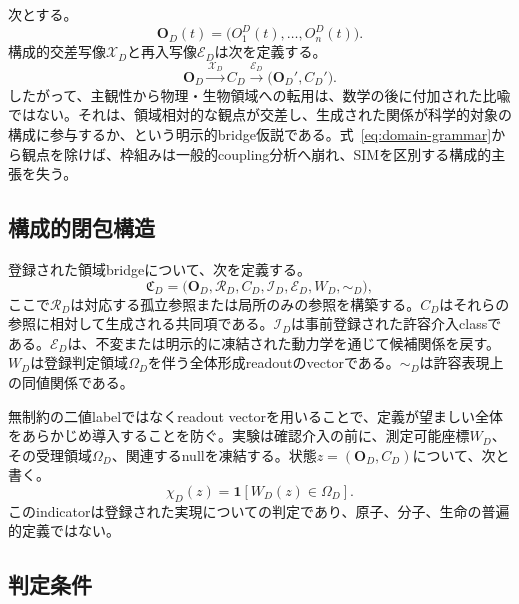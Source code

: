 \documentclass[11pt,a4paper]{article}
\begin{document}
次とする。
\begin{equation}
 \mathbf O_D(t)=\bigl(O_1^D(t),\ldots,O_n^D(t)\bigr).
\end{equation}
構成的交差写像$\mathcal X_D$と再入写像$\mathcal E_D$は次を定義する。
\begin{equation}
 \mathbf O_D
 \xrightarrow{\mathcal X_D}
 C_D
 \xrightarrow{\mathcal E_D}
 \bigl(\mathbf O_D',C_D'\bigr).
 \label{eq:domain-grammar}
\end{equation}
したがって、主観性から物理・生物領域への転用は、数学の後に付加された比喩ではない。それは、領域相対的な観点が交差し、生成された関係が科学的対象の構成に参与するか、という明示的bridge仮説である。式~\eqref{eq:domain-grammar}から観点を除けば、枠組みは一般的coupling分析へ崩れ、SIMを区別する構成的主張を失う。

\subsection{構成的閉包構造}

登録された領域bridgeについて、次を定義する。
\begin{equation}
 \mathfrak C_D=
 \bigl(\mathbf O_D,\mathcal R_D,C_D,\mathcal I_D,
       \mathcal E_D,W_D,\sim_D\bigr),
 \label{eq:closure-structure}
\end{equation}
ここで$\mathcal R_D$は対応する孤立参照または局所のみの参照を構築する。$C_D$はそれらの参照に相対して生成される共同項である。$\mathcal I_D$は事前登録された許容介入classである。$\mathcal E_D$は、不変または明示的に凍結された動力学を通じて候補関係を戻す。$W_D$は登録判定領域$\Omega_D$を伴う全体形成readoutのvectorである。$\sim_D$は許容表現上の同値関係である。

無制約の二値labelではなくreadout vectorを用いることで、定義が望ましい全体をあらかじめ導入することを防ぐ。実験は確認介入の前に、測定可能座標$W_D$、その受理領域$\Omega_D$、関連するnullを凍結する。状態$z=(\mathbf O_D,C_D)$について、次と書く。
\begin{equation}
 \chi_D(z)=\mathbf 1\!\left[W_D(z)\in\Omega_D\right].
 \label{eq:whole-criterion}
\end{equation}
このindicatorは登録された実現についての判定であり、原子、分子、生命の普遍的定義ではない。

\subsection{判定条件}
\end{document}
